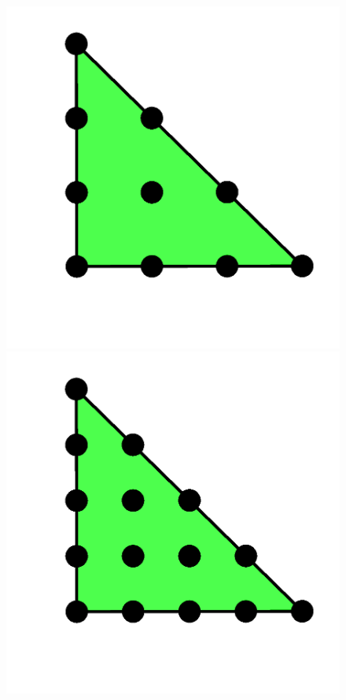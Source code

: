 \begin{figure}
{   \includegraphics[width=\threefigsfull]{chapters/kirby-6/png/CG3_2d.png} \\
   \includegraphics[width=\threefigsfull]{chapters/kirby-6/png/CG4_2d.png}
}
\end{figure}

